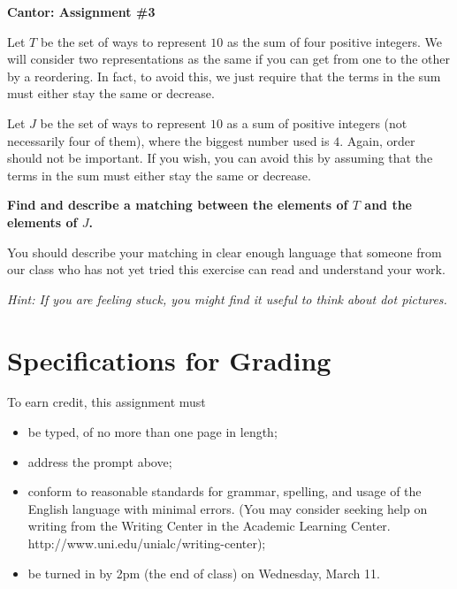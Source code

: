 \documentclass[12pt,letterpaper]{article}
\begin{document}
\setlength{\parskip}{1ex plus 0.5ex minus 0.2ex}
\setlength{\parindent}{0pt}

\pagestyle{fancy}
\lfoot{}
\rfoot{}

\begin{center}
{
\Large
\textbf{Cantor: Assignment \#3}
}
\end{center}

Let $T$ be the set of ways to represent $10$ as the sum of four positive integers.
We will consider two representations as the same if you can get from one to the other by  a reordering.
In fact, to avoid this, we just require that the terms in the sum must either stay the same or decrease.

Let $J$ be the set of ways to represent $10$ as a sum of positive integers (not necessarily four of them), where the biggest number used is $4$.
Again, order should not be important.
If you wish, you can avoid this by assuming that the terms in the sum must either stay the same or decrease.

\textbf{Find and describe a matching between the elements of $T$ and the elements of $J$.}

You should describe your matching in clear enough language that someone from our class who has not yet tried this exercise can read and understand your work.

\vspace{.25in}

\textit{Hint: If you are feeling stuck, you might find it useful to think about dot pictures.}

\section*{Specifications for Grading}

To earn credit, this assignment must
\begin{itemize}
\item be typed, of no more than one page in length;
\item address the prompt above;
\item conform to reasonable standards for grammar, spelling, and usage of the English language with minimal errors. (You may consider seeking help on writing from the Writing Center in the Academic Learning Center. http://www.uni.edu/unialc/writing-center);
\item be turned in by 2pm (the end of class) on Wednesday, March 11.
\end{itemize}
\end{document}
